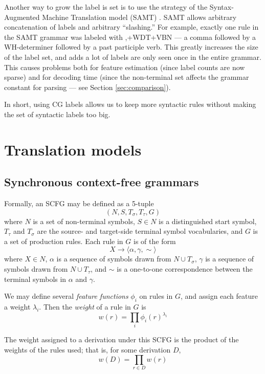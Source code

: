 \documentclass{article}
\begin{document}
Another way to grow the label is set is to use the strategy of the Syntax-Augmented Machine Translation model (SAMT) \cite{samt-wmt06}. SAMT allows arbitrary concatenation of labels and arbitrary ``slashing.'' For example, exactly one rule in the SAMT grammar was labeled with ,+WDT+VBN --- a comma followed by a WH-determiner followed by a past participle verb. This greatly increases the size of the label set, and adds a lot of labels are only seen once in the entire grammar. This causes problems both for feature estimation (since label counts are now sparse) and for decoding time (since the non-terminal set affects the grammar constant for parsing --- see Section \ref{sec:comparison}).

In short, using CG labels allows us to keep more syntactic rules without making the set of syntactic labels too big.

\section{Translation models}

\subsection{Synchronous context-free grammars}

Formally, an SCFG may be defined as a 5-tuple
$$(N,S,T_\sigma,T_\tau,G)$$
where $N$ is a set of non-terminal symbols, $S \in N$ is a distinguished start symbol, $T_\tau$ and $T_\sigma$ are the source- and target-side terminal symbol vocabularies, and $G$ is a set of production rules. Each rule in $G$ is of the form
$$X \to \langle \alpha, \gamma, \sim \rangle$$
where $X \in N$, $\alpha$ is a sequence of symbols drawn from $N \cup T_\sigma$, $\gamma$ is a sequence of symbols drawn from $N \cup T_\tau$, and $\sim$ is a one-to-one correspondence between the terminal symbols in $\alpha$ and $\gamma$.

We may define several {\em feature functions} $\phi_i$ on rules in $G$, and assign each feature a weight $\lambda_i$. Then the {\em weight} of a rule in $G$ is
\begin{equation}
w(r) = \prod_i{\phi_i(r)^{\lambda_i}}
\end{equation}

The weight assigned to a derivation under this SCFG is the product of the weights of the rules used; that is, for some derivation $D$,
\begin{equation}
w(D) = \prod_{r \in D}{w(r)}
\end{equation}
\end{document}
